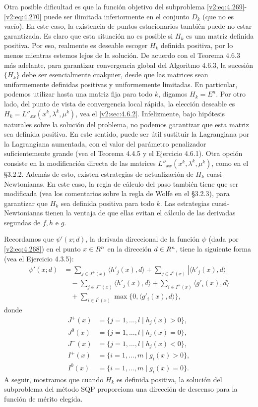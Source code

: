 Otra posible dificultad es que la función objetivo del subproblema \eqref{v2:eq:4.269}-\eqref{v2:eq:4.270} puede ser ilimitada inferiormente en el conjunto $D_k$ (que no es vacío). En este caso, la existencia de puntos estacionarios también puede no estar garantizada. Es claro que esta situación no es posible si $H_k$ es una matriz definida positiva. Por eso, realmente es deseable escoger $H_k$ definida positiva, por lo menos mientras estemos lejos de la solución. De acuerdo con el Teorema 4.6.3 más adelante, para garantizar convergencia global del Algoritmo 4.6.3, la sucesión $\{H_k\}$ debe ser esencialmente cualquier, desde que las matrices sean uniformemente definidas positivas y uniformemente limitadas. En particular, podemos utilizar hasta una matriz fija para todo $k$, digamos $H_k = E^n$. Por otro lado, del punto de vista de convergencia local rápida, la elección deseable es $H_k = L''_{xx}(x^k, \lambda^k, \mu^k)$, vea el \cref{v2:sec:4.6.2}. Infelizmente, bajo hipótesis naturales sobre la solución del problema, no podemos garantizar que esta matriz sea definida positiva. En este sentido, puede ser útil sustituir la Lagrangiana por la Lagrangiana aumentada, con el valor del parámetro penalizador suficientemente grande (vea el Teorema 4.4.5 y el Ejercicio 4.6.1). Otra opción consiste en la modificación directa de las matrices $L''_{xx}(x^k, \lambda^k, \mu^k)$, como en el \S 3.2.2. Además de esto, existen estrategias de actualización de $H_k$ cuasi-Newtonianas. En este caso, la regla de cálculo del paso también tiene que ser modificada (vea los comentarios sobre la regla de Wolfe en el \S 3.2.3), para garantizar que $H_k$ sea definida positiva para todo $k$. Las estrategias cuasi-Newtonianas tienen la ventaja de que ellas evitan el cálculo de las derivadas segundas de $f, h$ e $g$.

Recordamos que $\psi'(x; d)$, la derivada direccional de la función $\psi$ (dada por \eqref{v2:eq:4.268}) en el punto $x \in R^n$ en la dirección $d \in R^n$, tiene la siguiente forma (vea el Ejercicio 4.3.5):
\begin{align*}
    \psi'(x; d) &= \sum_{j \in J^+(x)} \langle h'_j(x), d \rangle + \sum_{j \in J^0(x)} |\langle h'_j(x), d \rangle| \\
    &\quad - \sum_{j \in J^-(x)} \langle h'_j(x), d \rangle + \sum_{i \in I^+(x)} \langle g'_i(x), d \rangle \\
    &\quad + \sum_{i \in I^0(x)} \max\{0, \langle g'_i(x), d \rangle\},
\end{align*}
donde
\begin{align*}
    J^+(x) &= \{j = 1, \dots, l \mid h_j(x) > 0\}, \\
    J^0(x) &= \{j = 1, \dots, l \mid h_j(x) = 0\}, \\
    J^-(x) &= \{j = 1, \dots, l \mid h_j(x) < 0\}, \\
    I^+(x) &= \{i = 1, \dots, m \mid g_i(x) > 0\}, \\
    I^0(x) &= \{i = 1, \dots, m \mid g_i(x) = 0\}.
\end{align*}
A seguir, mostramos que cuando $H_k$ es definida positiva, la solución del subproblema del método SQP proporciona una dirección de descenso para la función de mérito elegida.

